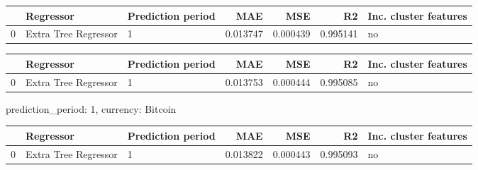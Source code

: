 \begin{tabular}{lllrrrl}
\toprule
{} &             Regressor & Prediction period &       MAE &       MSE &        R2 & Inc. cluster features \\
\midrule
0 &  Extra Tree Regressor &                 1 &  0.013747 &  0.000439 &  0.995141 &                    no \\
\bottomrule
\end{tabular}
\begin{tabular}{lllrrrl}
\toprule
{} &             Regressor & Prediction period &       MAE &       MSE &        R2 & Inc. cluster features \\
\midrule
0 &  Extra Tree Regressor &                 1 &  0.013753 &  0.000444 &  0.995085 &                    no \\
\bottomrule
\end{tabular}

 prediction_period: 1, currency: Bitcoin\begin{tabular}{lllrrrl}
\toprule
{} &             Regressor & Prediction period &       MAE &       MSE &        R2 & Inc. cluster features \\
\midrule
0 &  Extra Tree Regressor &                 1 &  0.013822 &  0.000443 &  0.995093 &                    no \\
\bottomrule
\end{tabular}
